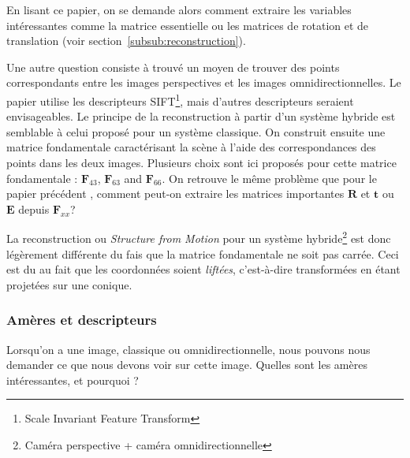 En lisant ce papier, on se demande alors comment extraire les variables intéressantes comme la matrice essentielle ou les matrices de rotation et de translation (voir section~\ref{subsub:reconstruction}).

Une autre question consiste à trouvé un moyen de trouver des points correspondants entre les images perspectives et les images omnidirectionnelles.
Le papier \cite{Puig08} utilise les descripteurs SIFT\footnote{Scale Invariant Feature Transform}, mais d'autres descripteurs seraient envisageables.
Le principe de la reconstruction à partir d'un système hybride est semblable à celui proposé pour un système classique.
On construit ensuite une matrice fondamentale caractérisant la scène à l'aide des correspondances des points dans les deux images.
Plusieurs choix sont ici proposés pour cette matrice fondamentale : $\mathbf{F}_{43}$, $\mathbf{F}_{63}$ and $\mathbf{F}_{66}$.
On retrouve le même problème que pour le papier précédent \cite{Sturm02}, comment peut-on extraire les matrices importantes $\mathbf{R}$ et $\mathbf{t}$ ou $\mathbf{E}$ depuis $\mathbf{F}_{xx}$?

 
  La reconstruction ou \emph{Structure from Motion} pour un système hybride\footnote{Caméra perspective + caméra omnidirectionnelle} \cite{Bastanlar09PhD} est donc légèrement différente du fais que la matrice fondamentale ne soit pas carrée.
Ceci est du au fait que les coordonnées soient \emph{liftées}, c'est-à-dire transformées en étant projetées sur une conique.

\subsubsection{Amères et descripteurs}

Lorsqu'on a une image, classique ou omnidirectionnelle, nous pouvons nous demander ce que nous devons voir sur cette image.
Quelles sont les amères intéressantes, et pourquoi ?

